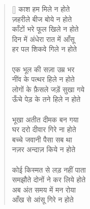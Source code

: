 \begin{verse}[\versewidth]\texthindi{
काश हम मिले न होते\\
ज़हरीले बीज बोये न होते\\
काँटों भरे फूल खिले न होते\\
दिन में अंधेरा रात में आँसू\\
हर पल शिकवे गिले न होते\\
\\
एक भूल की सज़ा उम्र भर\\
नींव के पत्थर हिले न होते\\
लोगों के फ़ैसले जड़ें सुखा गये\\
ऊँचे पेड़ के तने हिले न होते\\
\\
भूखा अतीत दीमक बन गया\\
घर दरो दीवार गिरे ना होते\\
बच्चे जवानी पैसा सब था\\
नज़र अन्दाज़ किये न होते\\
\\
कोई किस्मत से लड़ नहीं पाता\\
समझौते दोनों ने कर लिये होते\\
अब अंत समय में मन रोया\\
आँख से आंसू गिरे न होते
}\end{verse}


